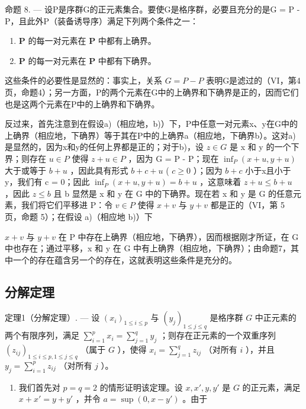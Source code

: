 命题 8. --- 设P是序群G的正元素集合。要使G是格序群，必要且充分的是G = P - P，且此外P（装备诱导序）满足下列两个条件之一：

\begin{enumerate}
\def\labelenumi{\alph{enumi})}
\item
  \(\mathbf{P}\) 的每一对元素在 \(\mathbf{P}\) 中都有上确界。
\item
  \(\mathbf{P}\) 的每一对元素在 \(\mathbf{P}\) 中都有下确界。
\end{enumerate}

这些条件的必要性是显然的：事实上，关系 \(G = P - P\) 表明G是滤过的（VI，第4页，命题4）；另一方面，P的两个元素在G中的上确界和下确界是正的，因而它们也是这两个元素在P中的上确界和下确界。

反过来，首先注意到在假设a)（相应地，b)）下，P中任意一对元素x、y在G中的上确界（相应地，下确界）等于其在P中的上确界a（相应地，下确界b）。这对a)是显然的，因为x和y的任何上界都是正的；对于b)，设 \(z \in G\) 是 x 和 y 的一个下界；则存在 \(u \in P\) 使得 \(z + u \in P\) ，因为 G = P - P；现在 \(\inf_{P}(x + u, y + u)\) 大于或等于 \(b + u\) ，因此具有形式 \(b + c + u\) ( \(c \geqslant 0\) ）；因为 \(b + c\) 小于x且小于y，我们有 c = 0；因此 \(\inf_{P}(x + u, y + u) = b + u\) ，这意味着 \(z + u \leqslant b + u\) ，因此 \(z \leqslant b\) 且 b 显然是 x 和 y 在 G 中的下确界。现在若 x 和 y 是 G 的任意元素，我们将它们平移进 P：令 \(v \in P\) 使得 \(x + v\) 与 \(y + v\) 都是正的（VI，第 5 页，命题 5）；在假设 a)（相应地 b)）下

\(x + v\) 与 \(y + v\) 在 P 中存在上确界（相应地，下确界），因而根据刚才所证，在 G 中也存在；通过平移，x 和 y 在 G 中有上确界（相应地，下确界）；由命题7，其中一个的存在蕴含另一个的存在，这就表明这些条件是充分的。

\subsection{分解定理}

定理1（分解定理）. --- 设 \((x_i)_{1 \leq i \leq p}\) 与 \((y_j)_{1 \leq j \leq q}\) 是格序群 \(G\) 中正元素的两个有限序列，满足 \(\sum_{i=1}^{p} x_i = \sum_{j=1}^{q} y_j\) ；则存在正元素的一个双重序列 \((z_{ij})_{1 \leq i \leq p, 1 \leq j \leq q}\) （属于 \(G\) ），使得 \(x_i = \sum_{j=1}^{q} z_{ij}\) （对所有 \(i\) ），并且 \(y_j = \sum_{i=1}^{p} z_{ij}\) （对所有 \(j\) ）。

\begin{enumerate}
\def\labelenumi{\arabic{enumi})}
\tightlist
\item
  我们首先对 \(p = q = 2\) 的情形证明该定理。设 \(x, x', y, y'\) 是 \(G\) 的正元素，满足 \(x + x' = y + y'\) ，并令 \(a = \sup (0, x - y')\) 。由于
\end{enumerate}

